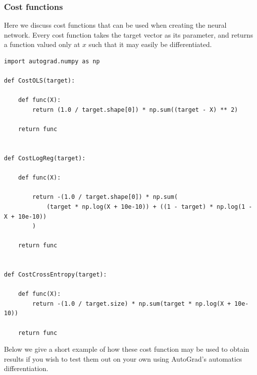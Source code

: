 \documentclass{beamer}
\begin{document}
\begin{frame}
\frametitle{Cost functions}

Here we discuss cost functions that can be used when creating the
neural network. Every cost function takes the target vector as its
parameter, and returns a function valued only at $x$ such that it may
easily be differentiated.





























\begin{verbatim}
import autograd.numpy as np

def CostOLS(target):
    
    def func(X):
        return (1.0 / target.shape[0]) * np.sum((target - X) ** 2)

    return func


def CostLogReg(target):

    def func(X):
        
        return -(1.0 / target.shape[0]) * np.sum(
            (target * np.log(X + 10e-10)) + ((1 - target) * np.log(1 - X + 10e-10))
        )

    return func


def CostCrossEntropy(target):
    
    def func(X):
        return -(1.0 / target.size) * np.sum(target * np.log(X + 10e-10))

    return func

\end{verbatim}


Below we give a short example of how these cost function may be used
to obtain results if you wish to test them out on your own using
AutoGrad's automatics differentiation.













\end{frame}
\end{document}
